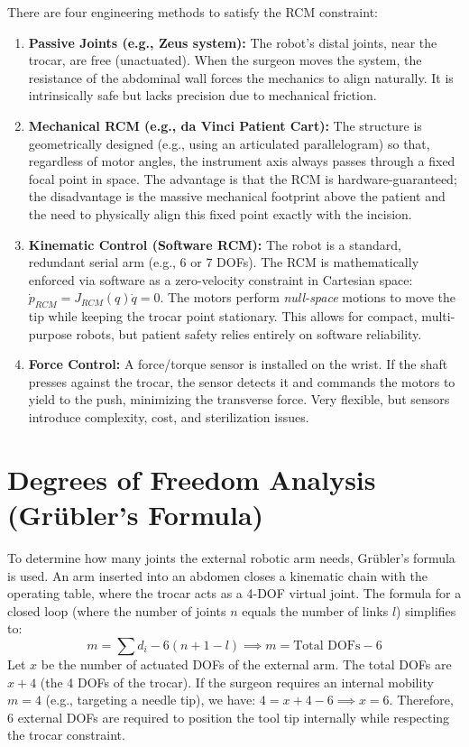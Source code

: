 \documentclass[11pt,a4paper,twoside]{report}
\begin{document}
There are four engineering methods to satisfy the RCM constraint:
\begin{enumerate}
    \item \textbf{Passive Joints (e.g., Zeus system):} The robot's distal joints, near the trocar, are free (unactuated). When the surgeon moves the system, the resistance of the abdominal wall forces the mechanics to align naturally. It is intrinsically safe but lacks precision due to mechanical friction.
    \item \textbf{Mechanical RCM (e.g., da Vinci Patient Cart):} The structure is geometrically designed (e.g., using an articulated parallelogram) so that, regardless of motor angles, the instrument axis always passes through a fixed focal point in space. The advantage is that the RCM is hardware-guaranteed; the disadvantage is the massive mechanical footprint above the patient and the need to physically align this fixed point exactly with the incision.
    \item \textbf{Kinematic Control (Software RCM):} The robot is a standard, redundant serial arm (e.g., 6 or 7 DOFs). The RCM is mathematically enforced via software as a zero-velocity constraint in Cartesian space: $\dot{p}_{RCM} = J_{RCM}(q) \dot{q} = 0$. The motors perform \textit{null-space} motions to move the tip while keeping the trocar point stationary. This allows for compact, multi-purpose robots, but patient safety relies entirely on software reliability.
    \item \textbf{Force Control:} A force/torque sensor is installed on the wrist. If the shaft presses against the trocar, the sensor detects it and commands the motors to yield to the push, minimizing the transverse force. Very flexible, but sensors introduce complexity, cost, and sterilization issues.
\end{enumerate}

\section{Degrees of Freedom Analysis (Grübler's Formula)}
To determine how many joints the external robotic arm needs, Grübler's formula is used. An arm inserted into an abdomen closes a kinematic chain with the operating table, where the trocar acts as a 4-DOF virtual joint.
The formula for a closed loop (where the number of joints $n$ equals the number of links $l$) simplifies to:
\begin{equation}
    m = \sum d_i - 6(n + 1 - l) \implies m = \text{Total DOFs} - 6
\end{equation}
Let $x$ be the number of actuated DOFs of the external arm. The total DOFs are $x + 4$ (the 4 DOFs of the trocar). If the surgeon requires an internal mobility $m=4$ (e.g., targeting a needle tip), we have:
$4 = x + 4 - 6 \implies x = 6$. Therefore, 6 external DOFs are required to position the tool tip internally while respecting the trocar constraint.
\end{document}
